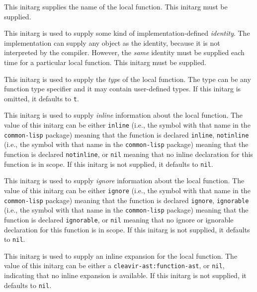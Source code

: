 
This initarg supplies the name of the local function.  This initarg
must be supplied.


This initarg is used to supply some kind of implementation-defined 
\emph{identity}.  The implementation can supply any object as the
identity, because it is not interpreted by the compiler.  However, the
\emph{same} identity must be supplied each time for a particular
local function.  This initarg must be supplied. 


This initarg is used to supply the \emph{type} of the local function.
The type can be any function type specifier and it may contain
user-defined types.  If this initarg is omitted, it defaults to
\texttt{t}.


This initarg is used to supply \emph{inline} information about the
local function.  The value of this initarg can be either
\texttt{inline} (i.e., the symbol with that name in the
\texttt{common-lisp} package) meaning that the function is declared
\texttt{inline}, \texttt{notinline} (i.e., the symbol with that name
in the \texttt{common-lisp} package) meaning that the function is
declared \texttt{notinline}, or \texttt{nil} meaning that no inline
declaration for this function is in scope.  If this initarg is not
supplied, it defaults to \texttt{nil}.


This initarg is used to supply \emph{ignore} information about the
local function.  The value of this initarg can be either
\texttt{ignore} (i.e., the symbol with that name in the
\texttt{common-lisp} package) meaning that the function is declared
\texttt{ignore}, \texttt{ignorable} (i.e., the symbol with that name
in the \texttt{common-lisp} package) meaning that the function is
declared \texttt{ignorable}, or \texttt{nil} meaning that no ignore or
ignorable declaration for this function is in scope.  If this initarg
is not supplied, it defaults to \texttt{nil}.


This initarg is used to supply an inline expansion for the local 
function. The value of this initarg can be either a
\texttt{cleavir-ast:function-ast}, or \texttt{nil}, indicating that
no inline expansion is available. If this initarg is not supplied,
it defaults to \texttt{nil}.

